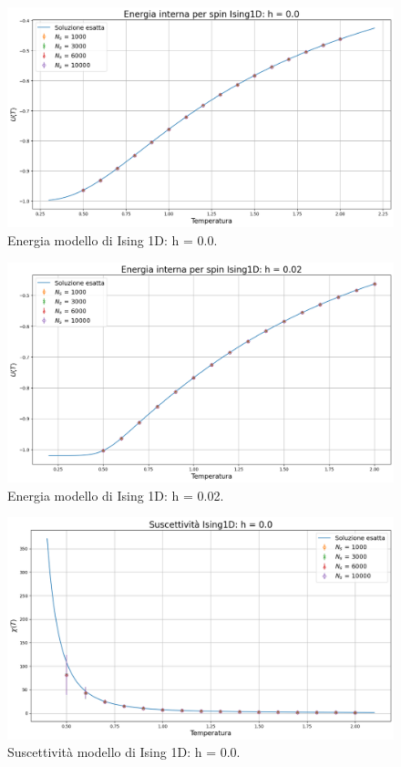 \begin{figure}[H]
    \centering
    \includegraphics[width=\textwidth]{Immagini/simIsing1D/ene_h0.0.png}
    \caption{Energia modello di Ising 1D: h = 0.0.}
    \label{fig: ene_Ising1D_h0.0}
\end{figure}

\begin{figure}[H]
    \centering
    \includegraphics[width=\textwidth]{Immagini/simIsing1D/ene_h0.02.png}
    \caption{Energia modello di Ising 1D: h = 0.02.}
    \label{fig: ene_Ising1D_h0.02}
\end{figure}

\begin{figure}[H]
    \centering
    \includegraphics[width=\textwidth]{Immagini/simIsing1D/chi_h0.0.png}
    \caption{Suscettività modello di Ising 1D: h = 0.0.}
    \label{fig: chi_Ising1D_h0.0}
\end{figure}

